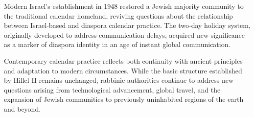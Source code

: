 \begin{historical}
Modern Israel's establishment in 1948 restored a Jewish majority community to the traditional calendar homeland, reviving questions about the relationship between Israel-based and diaspora calendar practice. The two-day holiday system, originally developed to address communication delays, acquired new significance as a marker of diaspora identity in an age of instant global communication.

Contemporary calendar practice reflects both continuity with ancient principles and adaptation to modern circumstances. While the basic structure established by Hillel II remains unchanged, rabbinic authorities continue to address new questions arising from technological advancement, global travel, and the expansion of Jewish communities to previously uninhabited regions of the earth and beyond.
\end{historical}
